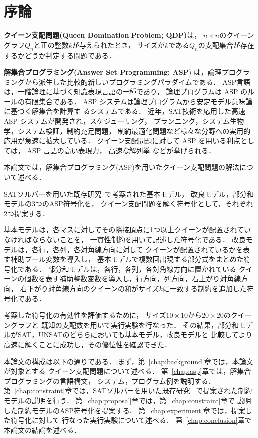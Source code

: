 \chapter{序論}\label{chap:introduction}

\textbf{クイーン支配問題(Queen Domination Problem; QDP)}は，
$n \times n$のクイーングラフ$Q_{n}$と正の整数$k$が与えられたとき，
サイズが$k$である$Q_{n}$の支配集合が存在するかどうか判定する問題である．

\textbf{解集合プログラミング(Answer Set Programming; ASP}\cite{%
  Baral03:cambridge,%
  Gelfond88:iclp,%
  Inoue08:jssst,%
  Niemela99:amai})
は，論理プログラミングから派生した比較的新しいプログラミングパラダイムである．
ASP言語は，一階論理に基づく知識表現言語の一種であり，
論理プログラムは ASP のルールの有限集合である．
ASP システムは論理プログラムから安定モデル意味論に基づく解集合を計算す
るシステムである．
近年，SAT技術を応用した高速 ASP システムが開発され，スケジューリング，
プランニング，システム生物学，システム検証，制約充足問題，
制約最適化問題など様々な分野への実用的応用が急速に拡大している．
クイーン支配問題に対して ASP を用いる利点としては，
ASP 言語の高い表現力，
高速な解列挙
などが挙げられる．

本論文では，解集合プログラミング(ASP)を用いたクイーン支配問題の解法について述べる．

SATソルバーを用いた既存研究~\cite{yamamoto21}で考案された基本モデル，
改良モデル，部分和モデルの3つのASP符号化を，
クイーン支配問題を解く符号化として，それぞれ2つ提案する．

基本モデルは，各マスに対してその隣接頂点に1つ以上クイーンが配置されていなければならないことを，
一貫性制約を用いて記述した符号化である．
改良モデルは，各行，各列，各対角線方向に対して
クイーンが配置されているかを表す補助ブール変数を導入し，
基本モデルで複数回出現する部分式をまとめた符号化である．
部分和モデルは，各行，各列，各対角線方向に置かれている
クイーンの個数を表す補助整数変数を導入し，行方向，列方向，右上がり対角線方向，
右下がり対角線方向のクイーンの和がサイズ$k$に一致する制約を追加した符号化である．

考案した符号化の有効性を評価するために，
サイズ$10 \times 10$から$20 \times 20$のクイーングラフと
既知の支配数を用いて実行実験を行なった．
その結果，部分和モデルがSAT，UNSATのどちらにおいても基本モデル，改良モデルと
比較してより高速に解くことに成功し，その優位性を確認できた．

本論文の構成は以下の通りである．
まず，第~\ref{chap:background}章では，本論文が対象とする
クイーン支配問題について述べる．
第~\ref{chap:asp}章では，解集合プログラミングの言語構文，
システム，プログラム例を説明する．
第~\ref{chap:constraint}章では，SATソルバーを用いた既存研究~\cite{yamamoto21}
で提案された制約モデルの説明を行う．
第~\ref{chap:proposal}章では，第~\ref{chap:constraint}章で
説明した制約モデルのASP符号化を提案する．
第~\ref{chap:experiment}章では，提案した符号化に対して
行なった実行実験について述べる．
第~\ref{chap:conclusion}章で本論文の結論を述べる．

